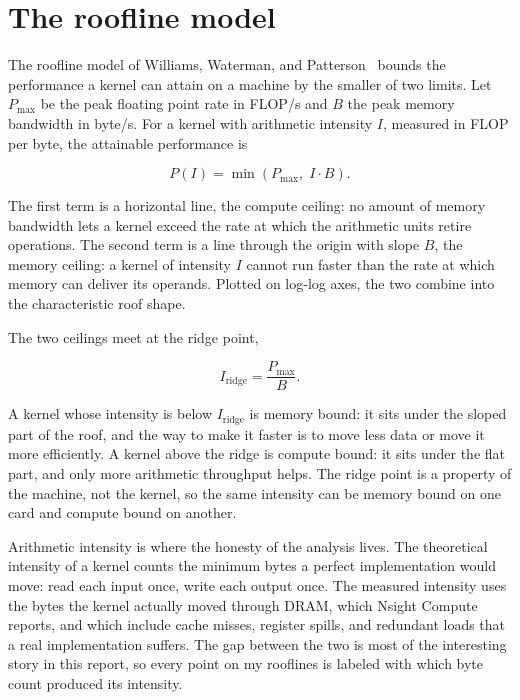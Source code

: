 \section{The roofline model}

The roofline model of Williams, Waterman, and Patterson~\cite{williams2009roofline}
bounds the performance a kernel can attain on a machine by the smaller of two
limits. Let $P_{\max}$ be the peak floating point rate in FLOP/s and $B$ the peak
memory bandwidth in byte/s. For a kernel with arithmetic intensity $I$, measured
in FLOP per byte, the attainable performance is

\begin{equation}
  P(I) = \min\!\left(P_{\max},\; I \cdot B\right).
\end{equation}

The first term is a horizontal line, the compute ceiling: no amount of memory
bandwidth lets a kernel exceed the rate at which the arithmetic units retire
operations. The second term is a line through the origin with slope $B$, the
memory ceiling: a kernel of intensity $I$ cannot run faster than the rate at
which memory can deliver its operands. Plotted on log-log axes, the two combine
into the characteristic roof shape.

The two ceilings meet at the ridge point,

\begin{equation}
  I_{\text{ridge}} = \frac{P_{\max}}{B}.
\end{equation}

A kernel whose intensity is below $I_{\text{ridge}}$ is memory bound: it sits
under the sloped part of the roof, and the way to make it faster is to move less
data or move it more efficiently. A kernel above the ridge is compute bound: it
sits under the flat part, and only more arithmetic throughput helps. The ridge
point is a property of the machine, not the kernel, so the same intensity can be
memory bound on one card and compute bound on another.

Arithmetic intensity is where the honesty of the analysis lives. The theoretical
intensity of a kernel counts the minimum bytes a perfect implementation would
move: read each input once, write each output once. The measured intensity uses
the bytes the kernel actually moved through DRAM, which Nsight Compute reports,
and which include cache misses, register spills, and redundant loads that a real
implementation suffers. The gap between the two is most of the interesting story
in this report, so every point on my rooflines is labeled with which byte count
produced its intensity.
